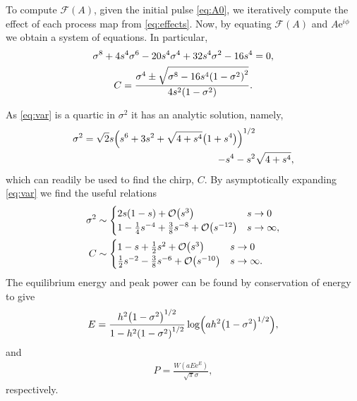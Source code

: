 \documentclass[10pt,twocolumn,a4paper]{article}
\let\originalleft\left
\let\originalright\right
\renewcommand{\left}{\mathopen{}\mathclose\bgroup\originalleft}
\renewcommand{\right}{\aftergroup\egroup\originalright}
\providecommand{\bigO}[1]{\ensuremath{\mathop{}\mathopen{}\mathcal{O}\mathopen{}\left(#1\right)}}
\begin{document}
To compute $\mathcal{F}(A)$, given the initial pulse \eqref{eq:A0}, we iteratively compute the effect of each process map from \eqref{eq:effects}. Now, by equating $\mathcal{F}(A)$ and $A \textrm{e}^{i \phi}$ we obtain a system of equations. In particular,
\begin{gather}
	\sigma^8 + 4 s^4 \sigma^6 - 20 s^4 \sigma^4 + 32 s^4 \sigma^2 - 16 s^4 = 0, \label{eq:var} \\
	C = \frac{\sigma^4 \pm \sqrt{\sigma^8 - 16 s^4 \left( 1 - \sigma^2 \right)^2}}{4 s^2 \left( 1 - \sigma^2 \right)}.
	\label{eq:chirp}
\end{gather}

As \eqref{eq:var} is a quartic in $\sigma^2$ it has an analytic solution, namely,
\begin{equation}
	\begin{split}
		\sigma^2 = \sqrt{2} s \left( s^6 + 3s^2 + \sqrt{4 + s^4} \left( 1 + s^4 \right) \right)^{1/2} & \\
		- s^4 - s^2 & \sqrt{4 + s^4},
		\label{eq:equilvar}
	\end{split}
\end{equation}
which can readily be used to find the chirp, $C$. By asymptotically expanding \eqref{eq:var} we find the useful relations
\begin{align}
	\sigma^2 &\sim
	\begin{cases}
		2s(1 - s) + \bigO{s^3} & s \rightarrow 0 \\
		1 - \frac{1}{4}s^{-4} + \frac{3}{8}s^{-8} + \bigO{s^{-12}} & s \rightarrow \infty,
	\end{cases} \\
	C &\sim
	\begin{cases}
		1 - s + \frac{1}{2}s^2 + \bigO{s^3} & s \rightarrow 0 \\
		\frac{1}{2}s^{-2} - \frac{3}{8}s^{-6} + \bigO{s^{-10}} & s \rightarrow \infty.
	\end{cases}
\end{align}
The equilibrium energy and peak power can be found by conservation of energy to give
\begin{align}
	E = \frac{h^2 \left( 1 - \sigma^2 \right)^{1/2}}{1 - h^2 \left( 1 - \sigma^2 \right)^{1/2}} \log \left( a h^2 \left( 1 - \sigma^2 \right)^{1/2} \right),
\end{align}
and
\begin{align}
	P = \frac{W(a E \textrm{e}^E)}{\sqrt{\pi} \sigma},
	\label{eq:equilpower}
\end{align}
respectively.
\end{document}

